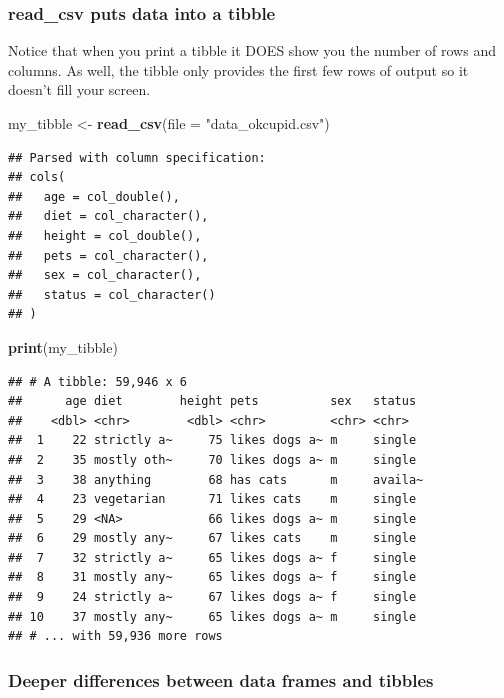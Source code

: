 \documentclass[
]{krantz}
\makeatletter
\newenvironment{Shaded}{\begin{snugshade}}{\end{snugshade}}
\newcommand{\DataTypeTok}[1]{\textcolor[rgb]{0.27,0.27,0.27}{#1}}
\newcommand{\KeywordTok}[1]{\textcolor[rgb]{0.27,0.27,0.27}{\textbf{#1}}}
\newcommand{\NormalTok}[1]{#1}
\newcommand{\StringTok}[1]{\textcolor[rgb]{0.5,0.5,0.5}{#1}}
\newenvironment{kframe}{%
\medskip{}
\setlength{\fboxsep}{.8em}
 \def\at@end@of@kframe{}%
 \ifinner\ifhmode%
  \def\at@end@of@kframe{\end{minipage}}%
  \begin{minipage}{\columnwidth}%
 \fi\fi%
 \def\FrameCommand##1{\hskip\@totalleftmargin \hskip-\fboxsep
 \colorbox{shadecolor}{##1}\hskip-\fboxsep
     \hskip-\linewidth \hskip-\@totalleftmargin \hskip\columnwidth}%
 \MakeFramed {\advance\hsize-\width
   \@totalleftmargin\z@ \linewidth\hsize
   \@setminipage}}%
 {\par\unskip\endMakeFramed%
 \at@end@of@kframe}
\renewenvironment{Shaded}{\begin{kframe}}{\end{kframe}}
\makeatother
\begin{document}
\hypertarget{read_csv-puts-data-into-a-tibble}{%
\subsubsection{read\_csv puts data into a tibble}\label{read_csv-puts-data-into-a-tibble}}

Notice that when you print a tibble it DOES show you the number of rows and columns. As well, the tibble only provides the first few rows of output so it doesn't fill your screen.

\begin{Shaded}
\begin{Highlighting}[]
\NormalTok{my_tibble <-}\StringTok{ }\KeywordTok{read_csv}\NormalTok{(}\DataTypeTok{file =} \StringTok{"data_okcupid.csv"}\NormalTok{)}
\end{Highlighting}
\end{Shaded}

\begin{verbatim}
## Parsed with column specification:
## cols(
##   age = col_double(),
##   diet = col_character(),
##   height = col_double(),
##   pets = col_character(),
##   sex = col_character(),
##   status = col_character()
## )
\end{verbatim}

\begin{Shaded}
\begin{Highlighting}[]
\KeywordTok{print}\NormalTok{(my_tibble)}
\end{Highlighting}
\end{Shaded}

\begin{verbatim}
## # A tibble: 59,946 x 6
##      age diet        height pets          sex   status 
##    <dbl> <chr>        <dbl> <chr>         <chr> <chr>  
##  1    22 strictly a~     75 likes dogs a~ m     single 
##  2    35 mostly oth~     70 likes dogs a~ m     single 
##  3    38 anything        68 has cats      m     availa~
##  4    23 vegetarian      71 likes cats    m     single 
##  5    29 <NA>            66 likes dogs a~ m     single 
##  6    29 mostly any~     67 likes cats    m     single 
##  7    32 strictly a~     65 likes dogs a~ f     single 
##  8    31 mostly any~     65 likes dogs a~ f     single 
##  9    24 strictly a~     67 likes dogs a~ f     single 
## 10    37 mostly any~     65 likes dogs a~ m     single 
## # ... with 59,936 more rows
\end{verbatim}

\hypertarget{deeper-differences-between-data-frames-and-tibbles}{%
\subsubsection{Deeper differences between data frames and tibbles}\label{deeper-differences-between-data-frames-and-tibbles}}
\end{document}
